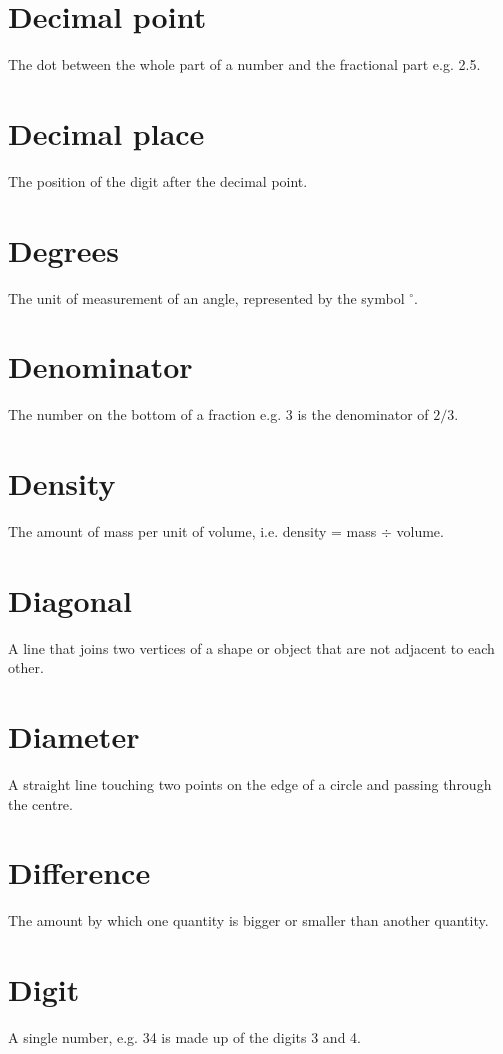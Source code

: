 \documentclass[10pt]{article}
\begin{document}
\section*{Decimal point}
The dot between the whole part of a number and the fractional part e.g. 2.5.

\section*{Decimal place}
The position of the digit after the decimal point.

\section*{Degrees}
The unit of measurement of an angle, represented by the symbol ${ }^{\circ}$.

\section*{Denominator}
The number on the bottom of a fraction e.g. 3 is the denominator of $2 / 3$.

\section*{Density}
The amount of mass per unit of volume, i.e. density = mass $\div$ volume.

\section*{Diagonal}
A line that joins two vertices of a shape or object that are not adjacent to each other.

\section*{Diameter}
A straight line touching two points on the edge of a circle and passing through the centre.

\section*{Difference}
The amount by which one quantity is bigger or smaller than another quantity.

\section*{Digit}
A single number, e.g. 34 is made up of the digits 3 and 4.
\end{document}
